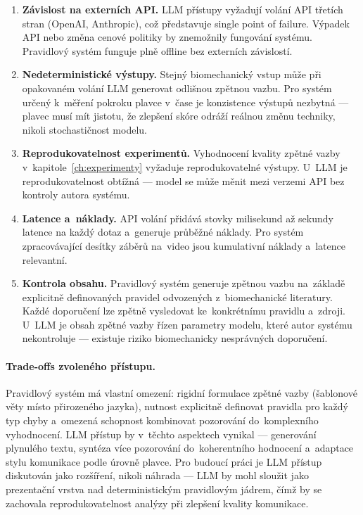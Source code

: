\begin{enumerate}
    \item \textbf{Závislost na externích API.} LLM přístupy vyžadují volání API třetích stran (OpenAI, Anthropic), což představuje single point of failure. Výpadek API nebo změna cenové politiky by znemožnily fungování systému. Pravidlový systém funguje plně offline bez externích závislostí.

    \item \textbf{Nedeterministické výstupy.} Stejný biomechanický vstup může při opakovaném volání LLM generovat odlišnou zpětnou vazbu. Pro systém určený k~měření pokroku plavce v~čase je konzistence výstupů nezbytná --- plavec musí mít jistotu, že zlepšení skóre odráží reálnou změnu techniky, nikoli stochastičnost modelu.

    \item \textbf{Reprodukovatelnost experimentů.} Vyhodnocení kvality zpětné vazby v~kapitole~\ref{ch:experimenty} vyžaduje reprodukovatelné výstupy. U~LLM je reprodukovatelnost obtížná --- model se může měnit mezi verzemi API bez kontroly autora systému.

    \item \textbf{Latence a~náklady.} API volání přidává stovky milisekund až sekundy latence na každý dotaz a~generuje průběžné náklady. Pro systém zpracovávající desítky záběrů na~video jsou kumulativní náklady a~latence relevantní.

    \item \textbf{Kontrola obsahu.} Pravidlový systém generuje zpětnou vazbu na~základě explicitně definovaných pravidel odvozených z~biomechanické literatury. Každé doporučení lze zpětně vysledovat ke~konkrétnímu pravidlu a~zdroji. U~LLM je obsah zpětné vazby řízen parametry modelu, které autor systému nekontroluje --- existuje riziko biomechanicky nesprávných doporučení.
\end{enumerate}

\paragraph{Trade-offs zvoleného přístupu.}
Pravidlový systém má vlastní omezení: rigidní formulace zpětné vazby (šablonové věty místo přirozeného jazyka), nutnost explicitně definovat pravidla pro každý typ chyby a~omezená schopnost kombinovat pozorování do~komplexního vyhodnocení. LLM přístup by v~těchto aspektech vynikal --- generování plynulého textu, syntéza více pozorování do~koherentního hodnocení a~adaptace stylu komunikace podle úrovně plavce. Pro budoucí práci je LLM přístup diskutován jako rozšíření, nikoli náhrada --- LLM by mohl sloužit jako prezentační vrstva nad deterministickým pravidlovým jádrem, čímž by se zachovala reprodukovatelnost analýzy při zlepšení kvality komunikace.
